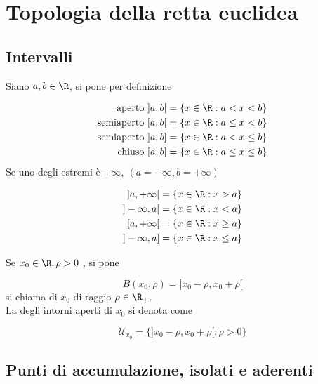 \documentclass[../appunti.tex]{subfiles}
\begin{document}
\section{Topologia della retta euclidea}

\subsection{Intervalli}
Siano $a,b \in \R$, si pone per definizione 


\begin{equation}
	\begin{aligned}
	\mbox{aperto}    \ ] a,b [ &= \{ x \in \R : a < x < b \}\\
	\mbox{semiaperto}\ [ a,b [ &= \{ x \in \R : a \leq x < b\}\\
	\mbox{semiaperto}\ ] a,b ] &= \{ x \in \R : a < x \leq b\}\\
	\mbox{chiuso}    \ [ a,b ] &= \{ x \in \R : a \leq x \leq b\}
	\end{aligned} %
\end{equation}
Se uno degli estremi è $\pm \infty,\ (a = - \infty, b = + \infty)$


\begin{equation}
	\begin{aligned}
		] a, +\infty [ &= \{ x \in \R: x > a \}\\
		] -\infty, a [ &= \{ x \in \R: x < a \}\\
		[ a, +\infty [ &= \{ x \in \R: x \geq a \}\\
		] -\infty, a ] &= \{ x \in \R: x \leq a \}\\
	\end{aligned}
\end{equation}

\begin{defn}
Se $ x_0 \in \R, \rho > 0$ , si pone 


\begin{equation}
	B( x_0, \rho) = ] x_0 - \rho, x_0 + \rho [
\end{equation}
si chiama  di $x_0$ di raggio $\rho \in \R_+$.\\
La  degli intorni aperti di $x_0$ si denota come


\begin{equation}
	\mathcal{U}_{x_0} = \{ ] x_0 - \rho, x_0 + \rho [ : \rho > 0 \}
\end{equation}
\end{defn}

\subsection{Punti di accumulazione, isolati e aderenti}
\end{document}
